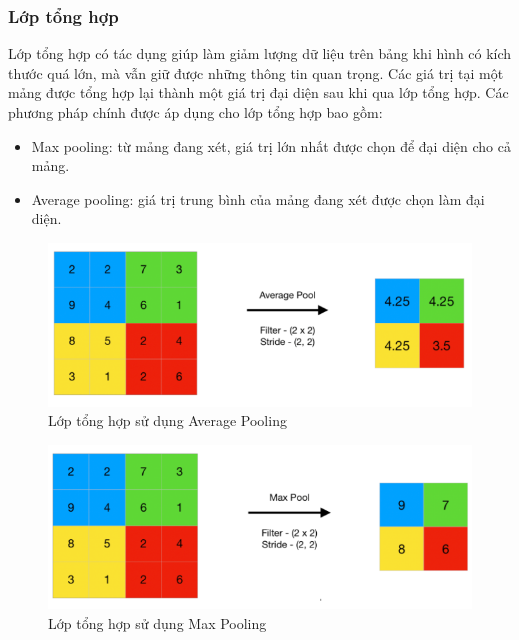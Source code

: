\subsubsection*{Lớp tổng hợp}
Lớp tổng hợp có tác dụng giúp làm giảm lượng dữ liệu trên bảng khi hình có kích thước quá lớn, mà vẫn giữ được những thông tin quan trọng. Các giá trị tại một mảng được tổng hợp lại thành một giá trị đại diện sau khi qua lớp tổng hợp. Các phương pháp chính được áp dụng cho lớp tổng hợp bao gồm:
\begin{itemize}
    \item Max pooling: từ mảng đang xét, giá trị lớn nhất được chọn để đại diện cho cả mảng.
    \item Average pooling: giá trị trung bình của mảng đang xét được chọn làm đại diện.
\end{itemize}
\begin{figure}[H]
    \centering
    \includegraphics[scale=0.7]{pics/Chapter3/avgpool.png}
    \caption{Lớp tổng hợp sử dụng Average Pooling \cite{poolingg4g}}
    \label{fig:enter-label}
\end{figure}
\begin{figure}[H]
    \centering
    \includegraphics[scale=0.7]{pics/Chapter3/maxpool.png}
    \caption{Lớp tổng hợp sử dụng Max Pooling  \cite{poolingg4g}}
    \label{fig:enter-label}
\end{figure}
